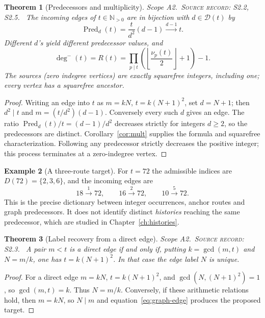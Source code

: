 \documentclass[11pt,oneside,openany]{book}
\newtheorem{theorem}{Theorem}[chapter]
\theoremstyle{definition}
\newtheorem{example}[theorem]{Example}
\theoremstyle{remark}
\newcommand{\N}{\mathbb{N}}
\newcommand{\Dx}{\mathcal{D}}
\newcommand{\gcdop}{\operatorname{gcd}}
\newcommand{\Pred}{\operatorname{Pred}}
\newcommand{\scope}[1]{\textsf{\small Scope #1.}\ }
\newcommand{\record}[1]{\textup{\textsc{Source record: #1.}}\ }
\begin{document}
\begin{theorem}[Predecessors and multiplicity]\label{thm:pred}
\scope{A2}\record{S2.2, S2.5} The incoming edges of \(t\in\N_{>0}\) are in bijection with \(d\in\Dx(t)\) by
\begin{equation}\label{eq:pred}
 \Pred_d(t)=\frac{t}{d^2}(d-1)
 \overset{d-1}{\longrightarrow}t.
\end{equation}
Different \(d\)'s yield different predecessor values, and
\[
 \deg^-(t)=R(t)=\prod_{p\mid t}
 \left(\left\lfloor\frac{\nu_p(t)}2\right\rfloor+1\right)-1.
\]
The sources (zero indegree vertices) are exactly squarefree integers, including one; every vertex has a squarefree ancestor.
\end{theorem}
\begin{proof}
Writing an edge into \(t\) as \(m=kN\), \(t=k(N+1)^2\), set \(d=N+1\); then \(d^2\mid t\) and \(m=(t/d^2)(d-1)\). Conversely every such \(d\) gives an edge. The ratio \(\Pred_d(t)/t=(d-1)/d^2\) decreases strictly for integers \(d\ge2\), so the predecessors are distinct. Corollary~\ref{cor:mult} supplies the formula and squarefree characterization. Following any predecessor strictly decreases the positive integer; this process terminates at a zero-indegree vertex.
\end{proof}

\begin{example}[A three-route target]\label{ex:72}
For \(t=72\) the admissible indices are \(D(72)=\{2,3,6\}\), and the incoming edges are
\[
 18\overset1\longrightarrow72,\qquad
 16\overset2\longrightarrow72,\qquad
 10\overset5\longrightarrow72.
\]
This is the precise dictionary between integer occurrences, anchor routes and graph predecessors. It does not identify distinct \emph{histories} reaching the same predecessor, which are studied in Chapter~\ref{ch:histories}.
\end{example}

\begin{theorem}[Label recovery from a direct edge]\label{thm:edgelabel}
\scope{A2}\record{S2.3} A pair \(m<t\) is a direct edge if and only if, putting \(k=\gcdop(m,t)\) and \(N=m/k\), one has \(t=k(N+1)^2\). In that case the edge label \(N\) is unique.
\end{theorem}
\begin{proof}
For a direct edge \(m=kN\), \(t=k(N+1)^2\), and \(\gcdop(N,(N+1)^2)=1\), so \(\gcdop(m,t)=k\). Thus \(N=m/k\). Conversely, if these arithmetic relations hold, then \(m=kN\), so \(N\mid m\) and equation~\eqref{eq:graph-edge} produces the proposed target.
\end{proof}
\end{document}
